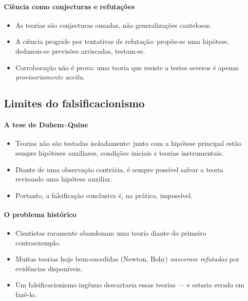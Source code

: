 \documentclass[9pt,a4paper]{extarticle}
\newcommand{\impt}[1]{\textcolor{important}{#1}}
\newcommand{\ntc}[1]{\textcolor{notice}{#1}}
\begin{document}
\paragraph{Ciência como conjecturas e refutações}

\begin{itemize}
    \item As teorias são \impt{conjecturas ousadas}, não generalizações cautelosas.
    \item A ciência progride por tentativas de refutação: propõe-se uma hipótese, deduzem-se previsões arriscadas, testam-se.
    \item \ntc{Corroboração} não é prova: uma teoria que resiste a testes severos é apenas \emph{provisoriamente aceita}.
\end{itemize}

\subsection{Limites do falsificacionismo}

\paragraph{A tese de Duhem--Quine}
\begin{itemize}
    \item Teorias não são testadas isoladamente: junto com a hipótese principal estão sempre hipóteses auxiliares, condições iniciais e teorias instrumentais.
    \item Diante de uma observação contrária, é sempre possível \impt{salvar a teoria revisando uma hipótese auxiliar}.
    \item Portanto, a falsificação conclusiva é, na prática, impossível.
\end{itemize}

\paragraph{O problema histórico}
\begin{itemize}
    \item Cientistas raramente abandonam uma teoria diante do primeiro contraexemplo.
    \item Muitas teorias hoje bem-sucedidas (Newton, Bohr) \emph{nasceram refutadas} por evidências disponíveis.
    \item Um falsificacionismo ingênuo descartaria essas teorias --- e estaria errado em fazê-lo.
\end{itemize}
\end{document}
